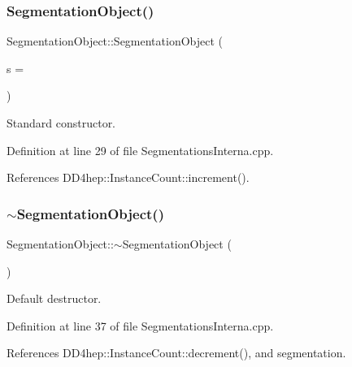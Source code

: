 \subsubsection{\texorpdfstring{Segmentation\+Object()}{SegmentationObject()}}
{\footnotesize\ttfamily Segmentation\+Object\+::\+Segmentation\+Object (\begin{DoxyParamCaption}\item[{\hyperlink{class_d_d4hep_1_1_geometry_1_1_segmentation_object_a57ca8eb515f079fdc61916df50468818}{Base\+Segmentation} $\ast$}]{s = {} }\end{DoxyParamCaption})}



Standard constructor. 



Definition at line 29 of file Segmentations\+Interna.\+cpp.



References D\+D4hep\+::\+Instance\+Count\+::increment().

\hypertarget{class_d_d4hep_1_1_geometry_1_1_segmentation_object_ad2db3a9de2c3add55caf0c549cf93892}{}\label{class_d_d4hep_1_1_geometry_1_1_segmentation_object_ad2db3a9de2c3add55caf0c549cf93892} 
\subsubsection{\texorpdfstring{$\sim$\+Segmentation\+Object()}{~SegmentationObject()}}
{\footnotesize\ttfamily Segmentation\+Object\+::$\sim$\+Segmentation\+Object (\begin{DoxyParamCaption}{ }\end{DoxyParamCaption})\hspace{0.3cm}{\ttfamily [virtual]}}



Default destructor. 



Definition at line 37 of file Segmentations\+Interna.\+cpp.



References D\+D4hep\+::\+Instance\+Count\+::decrement(), and segmentation.



